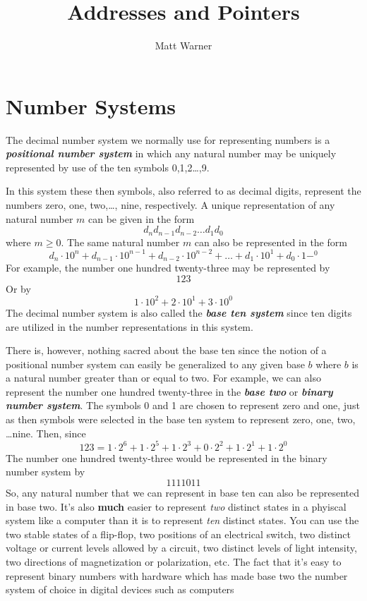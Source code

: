 \documentclass{report}
\title{\Huge{Addresses and Pointers}}
\author{\huge{Matt Warner}}
\date{\huge{}}
\begin{document}
  \maketitle
\tableofcontents
\clearpage
\section{Number Systems}
The decimal number system we normally use for representing numbers is a \textbf{\textit{positional number system}} in which any natural number may be uniquely represented by use of the ten symbols 0,1,2\ldots,9.  \vspace{1.5mm}

\noindent In this system these then symbols, also referred to as decimal digits, represent the numbers zero, one, two,\ldots, nine, respectively. A unique representation of any natural number $m$ can be given in the form
$$ d_nd_{n-1}d_{n-2}\ldots d_1d_0$$
where $m\ge 0$. The same natural number $m$ can also be represented in the form
$$d_n\cdot 10^n + d_{n-1}\cdot 10^{n-1} + d_{n-2}\cdot 10^{n-2}+\ldots + d_1\cdot 10^1+d_0\cdot 1-^0$$
For example, the number one hundred twenty-three may be represented by
$$123$$
Or by
$$ 1\cdot 10^2+2\cdot 10^1 + 3 \cdot 10^0$$
\bigbreak \noindent
The decimal number system is also called the \textbf{\textit{base ten system}} since ten digits are utilized in the number representations in this system.  \vspace{1.5mm}

\noindent There is, however, nothing sacred about the base ten since the notion of a positional number system can easily be generalized to any given base $b$ where $b$ is a natural number greater than or equal to two.
\bigbreak \noindent
For example, we can also represent the number one hundred twenty-three in the \textit{\textbf{base two}} or \textit{\textbf{binary number system}}. The symbols 0 and 1 are chosen to represent zero and one, just as then symbols were selected in the base ten system to represent zero, one, two, \ldots nine. Then, since
$$ 123 = 1\cdot 2^6 + 1 \cdot 2^5 + 1 \cdot 2^3 + 0\cdot 2^2 + 1 \cdot 2^1 + 1 \cdot 2^0$$
The number one hundred twenty-three would be represented in the binary number system by
$$ 1111011 $$
\bigbreak \noindent
So, any natural number that we can represent in base ten can also be represented in base two. It's also \textbf{much} easier to represent \textit{two} distinct states in a phyiscal system like a computer than it is to represent \textit{ten} distinct states. You can use the two stable states of a flip-flop, two positions of an electrical switch, two distinct voltage or current levels allowed by a circuit, two distinct levels of light intensity, two directions of magnetization or polarization, etc.
\bigbreak \noindent
The fact that it's easy to represent binary numbers with hardware which has made base two the number system of choice in digital devices such as computers
\end{document}
